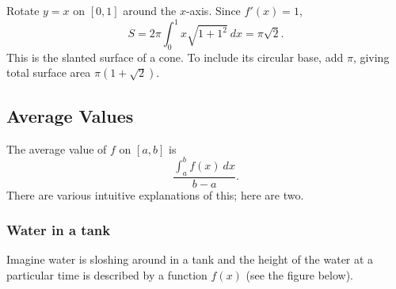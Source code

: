 \begin{exampleblock}
Rotate $y=x$ on $[0,1]$ around the $x$-axis. Since $f'(x)=1$,
$$S=2\pi\int_0^1x\sqrt{1+1^2}\ dx=\pi\sqrt2.$$
This is the slanted surface of a cone. To include its circular base,
add $\pi$, giving total surface area $\pi(1+\sqrt2)$.
\end{exampleblock}

\subsection{Average Values}

The average value of $f$ on $[a,b]$ is
$$\frac{\displaystyle\int_a^bf(x)\ dx}{b-a}.$$
There are various intuitive explanations of this; here are two.

\subsubsection{Water in a tank}
Imagine water is sloshing around in a tank and the height of the water at a particular time is described by a function $f(x)$ (see the figure below).

